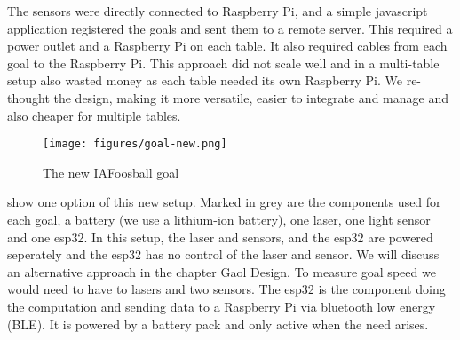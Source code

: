 The sensors were directly connected to Raspberry Pi, and a simple javascript application registered the goals and sent them to a remote server. This required a power outlet and a Raspberry Pi on each table. It also required cables from each goal to the Raspberry Pi. This approach did not scale well and in a multi-table setup also wasted money as each table needed its own Raspberry Pi. We re-thought the design, making it more versatile, easier to integrate and manage and also cheaper for multiple tables.

\begin{figure}[h!]
    \centering
    \texttt{[image: figures/goal-new.png]}%
    \caption{The new IAFoosball goal}\label{fig:goalNew}
\end{figure}

 show one option of this new setup. Marked in grey are the components used for each goal, a battery (we use a lithium-ion battery), one laser, one light sensor and one esp32. In this setup, the laser and sensors, and the esp32 are powered seperately and the esp32 has no control of the laser and sensor. We will discuss an alternative approach in the chapter Gaol Design. To measure goal speed we would need to have to lasers and two sensors. The esp32 is the component doing the computation and sending data to a Raspberry Pi via bluetooth low energy (BLE). It is powered by a battery pack and only active when the need arises.\\

